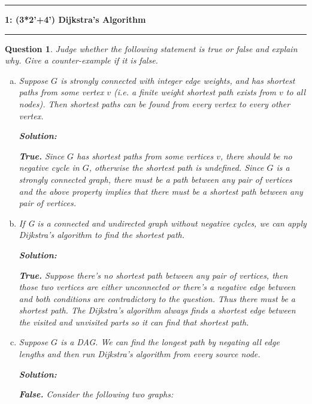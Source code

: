 \documentclass[10.5pt]{article}
\newcommand\question[2]{\vspace{.25in}\hrule\textbf{#1: #2}\vspace{.5em}\hrule\vspace{.10in}}
\newtheorem{Q}{Question}
\begin{document}
\question{1}{(3*2'+4') Dijkstra's Algorithm}
\begin{Q}
	Judge whether the following statement is true or false and explain why. Give a counter-example if it is false.
	\begin{enumerate}[(a)]
		\item Suppose $G$ is strongly connected with integer edge weights, and has shortest paths from some
		vertex $v$ (i.e. a finite weight shortest path exists from $v$ to all nodes). Then shortest paths can be found from every vertex to every other vertex.
		\par\rm\textbf{Solution:}
		\par\textbf{True.} Since $G$ has shortest paths from some vertices $v$, there should be no negative cycle in $G$, otherwise the shortest path is undefined. Since $G$ is a strongly connected graph, there must be a path between any pair of vertices and the above property implies that there must be a shortest path between any pair of vertices.
		\vspace{8pt}
		\item If G is a connected and undirected graph without negative cycles, we can apply Dijkstra's algorithm to find the shortest path.
		\par\textbf{Solution:}
		\par\textbf{True.} Suppose there's no shortest path between any pair of vertices, then those two vertices are either unconnected or there's a negative edge between and both conditions are contradictory to the question. Thus there must be a shortest path. The Dijkstra's algorithm always finds a shortest edge between the visited and unvisited parts so it can find that shortest path.
		\vspace{8pt}
		\item Suppose $G$ is a DAG. We can find the longest path by negating all edge lengths and then run Dijkstra's algorithm from every source node.
		\par\textbf{Solution:}
		\par\textbf{False.} Consider the following two graphs:
		\begin{figure}[htbp]
		\centering
\end{figure}
\end{enumerate}
\end{Q}
\end{document}
